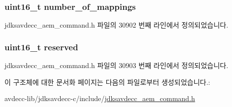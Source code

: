 \subsubsection[{\texorpdfstring{number\+\_\+of\+\_\+mappings}{number_of_mappings}}]{\setlength{\rightskip}{0pt plus 5cm}uint16\+\_\+t number\+\_\+of\+\_\+mappings}\hypertarget{structjdksavdecc__aem__command__remove__video__mappings_ac7db472c5622ef473d5d0a5c416d5531}{}\label{structjdksavdecc__aem__command__remove__video__mappings_ac7db472c5622ef473d5d0a5c416d5531}


jdksavdecc\+\_\+aem\+\_\+command.\+h 파일의 30902 번째 라인에서 정의되었습니다.

\subsubsection[{\texorpdfstring{reserved}{reserved}}]{\setlength{\rightskip}{0pt plus 5cm}uint16\+\_\+t reserved}\hypertarget{structjdksavdecc__aem__command__remove__video__mappings_a5a6ed8c04a3db86066924b1a1bf4dad3}{}\label{structjdksavdecc__aem__command__remove__video__mappings_a5a6ed8c04a3db86066924b1a1bf4dad3}


jdksavdecc\+\_\+aem\+\_\+command.\+h 파일의 30903 번째 라인에서 정의되었습니다.



이 구조체에 대한 문서화 페이지는 다음의 파일로부터 생성되었습니다.\+:\begin{DoxyCompactItemize}
\item 
avdecc-\/lib/jdksavdecc-\/c/include/\hyperlink{jdksavdecc__aem__command_8h}{jdksavdecc\+\_\+aem\+\_\+command.\+h}\end{DoxyCompactItemize}
